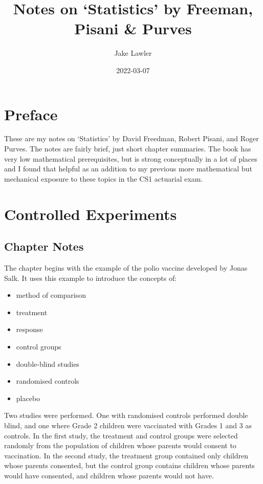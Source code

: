 \documentclass[
]{book}
\title{Notes on `Statistics' by Freeman, Pisani \& Purves}
\author{Jake Lawler}
\date{2022-03-07}
\providecommand{\tightlist}{%
  \setlength{\itemsep}{0pt}\setlength{\parskip}{0pt}}
\begin{document}
\maketitle

{
\setcounter{tocdepth}{1}
\tableofcontents
}
\hypertarget{preface}{%
\chapter*{Preface}\label{preface}}

These are my notes on `Statistics' by David Freedman, Robert Pisani, and Roger Purves. The notes are fairly brief, just short chapter summaries. The book has very low mathematical prerequisites, but is strong conceptually in a lot of places and I found that helpful as an addition to my previous more mathematical but mechanical exposure to these topics in the CS1 actuarial exam.

\hypertarget{experiments}{%
\chapter{Controlled Experiments}\label{experiments}}

\hypertarget{chapter-notes}{%
\section{Chapter Notes}\label{chapter-notes}}

The chapter begins with the example of the polio vaccine developed by Jonas Salk. It uses this example to introduce the concepts of:

\begin{itemize}
\tightlist
\item
  method of comparison
\item
  treatment
\item
  response
\item
  control groups
\item
  double-blind studies
\item
  randomised controls
\item
  placebo
\end{itemize}

Two studies were performed. One with randomised controls performed double blind, and one where Grade 2 children were vaccinated with Grades 1 and 3 as controls. In the first study, the treatment and control groups were selected randomly from the population of children whose parents would consent to vaccination. In the second study, the treatment group contained only children whose parents consented, but the control group contains children whose parents would have consented, and children whose parents would not have.
\end{document}
